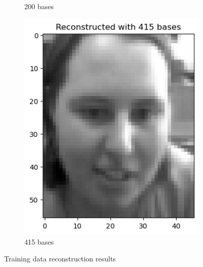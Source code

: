 \begin{figure}
\begin{subfigure}[t]{0.2\linewidth}
		\caption{200 bases}
		\label{fig:train_re_200}
	\end{subfigure}
    \hfill
	\begin{subfigure}[t]{0.2\linewidth}
		\centering
		\includegraphics[width=\linewidth]{image/q1_recon_train_415.png}
		\caption{415 bases}
		\label{fig:train_re_415}
	\end{subfigure}
	\caption{Training data reconstruction results}
	\label{fig:recon_train}
\end{figure}

